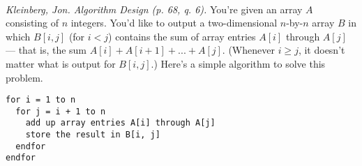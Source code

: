 \documentclass[solutionorbox,answers]{exam}
\begin{document}
\begin{questions}
\begin{parts}
    \nopagebreak
    \begin{solutionbox}{2in} \vspace{1em} \\
  \end{solutionbox}
  
\end{parts}

\pagebreak

\question \textit{Kleinberg, Jon. Algorithm Design (p. 68, q. 6).} You're given an array $A$ consisting of $n$ integers. You'd like to output a two-dimensional $n$-by-$n$ array $B$ in which $B[i, j]$ (for $i < j$) contains the sum of array entries $A[i]$ through $A[j]$ — that is, the sum $A[i]+ A[i + 1]+... + A[j]$. (Whenever $i \geq j$, it doesn't matter what is output for $B[i,j]$.)  
Here's a simple algorithm to solve this problem. 

\begin{lstlisting}
for i = 1 to n
  for j = i + 1 to n  
    add up array entries A[i] through A[j]
    store the result in B[i, j]
  endfor  
endfor 
\end{lstlisting}

\end{questions}
\end{document}
